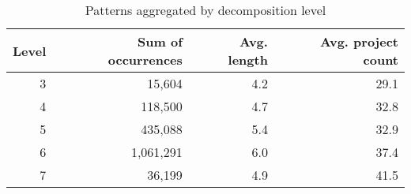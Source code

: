 \newcommand{\tableHeadPatternsDecomp}{\bfseries{Level}\rm & \bfseries{Sum of
occurrences}\rm & \bfseries{Avg. length}\rm & \bfseries{Avg. project count}\rm}
\begin{table}[H]
\caption{Patterns aggregated by decomposition
level}\label{table:patterns_decomp}
\centering
\begin{tabular}{rrrr}
\hline
	\tableHeadPatternsDecomp \\ \hline
	3 & 15,604 & 4.2 & 29.1 \\
	4 & 118,500 & 4.7 & 32.8 \\
	5 & 435,088 & 5.4 & 32.9 \\
	6 & 1,061,291 & 6.0 & 37.4 \\
	7 & 36,199 & 4.9 & 41.5 \\
\hline
\end{tabular}
\end{table}
